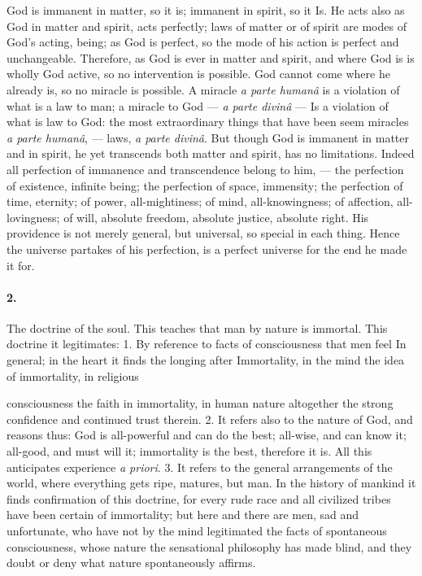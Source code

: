 \documentclass[12pt]{article}
\begin{document}
God is immanent in matter, so it is; immanent in 
spirit, so it Is. He acts also as God in matter and 
spirit, acts perfectly; laws of matter or of spirit are 
modes of God's acting, being; as God is perfect, so 
the mode of his action is perfect and unchangeable. 
Therefore, as God is ever in matter and spirit, and 
where God is is wholly God active, so no intervention is 
possible. God cannot come where he already is, so no 
miracle is possible. A miracle \emph{a parte human\^{a}} is a violation of what is a law to man; a miracle to God --- \emph{a parte divin\^{a}} --- Is a violation of what is law to God: the 
most extraordinary things that have been seem miracles 
\emph{a parte human\^{a}}, --- laws, \emph{a parte divin\^{a}}. But though 
God is immanent in matter and in spirit, he yet transcends both matter and spirit, has no limitations. Indeed all perfection of immanence and transcendence 
belong to him, --- the perfection of existence, infinite 
being; the perfection of space, immensity; the perfection of time, eternity; of power, all-mightiness; of 
mind, all-knowingness; of affection, all-lovingness; of 
will, absolute freedom, absolute justice, absolute right. 
His providence is not merely general, but universal, 
so special in each thing. Hence the universe partakes 
of his perfection, is a perfect universe for the end he 
made it for. 

\paragraph{2.} The doctrine of the soul. This teaches that man 
by nature is immortal. This doctrine it legitimates: 1. 
By reference to facts of consciousness that men feel In 
general; in the heart it finds the longing after Immortality, in the mind the idea of immortality, in religious 




consciousness the faith in immortality, in human nature 
altogether the strong confidence and continued trust 
therein. 2. It refers also to the nature of God, and 
reasons thus: God is all-powerful and can do the best; 
all-wise, and can know it; all-good, and must will it; 
immortality is the best, therefore it is. All this anticipates experience \emph{a priori}. 3. It refers to the general arrangements of the world, where everything gets 
ripe, matures, but man. In the history of mankind 
it finds confirmation of this doctrine, for every rude 
race and all civilized tribes have been certain of immortality; but here and there are men, sad and unfortunate, who have not by the mind legitimated the facts 
of spontaneous consciousness, whose nature the sensational philosophy has made blind, and they doubt or 
deny what nature spontaneously affirms. 
\end{document}
